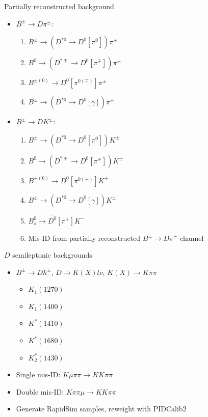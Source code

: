 \documentclass{beamer}
\begin{document}
\begin{frame}{Partially reconstructed background}
  \begin{itemize}
    \setlength\itemsep{1.3em}
    \item{$B^\pm\to D\pi^\pm$:}
    \begin{enumerate}
    \setlength\itemsep{0.4em}
      \item{$B^\pm\to (D^{*0}\to D^0[\pi^0])\pi^\pm$}
      \item{$B^0\to (D^{*\mp}\to D^0[\pi^\mp])\pi^\pm$}
      \item{$B^{\pm(0)}\to D^0[\pi^{0(\mp)}]\pi^\pm$}
      \item{$B^\pm\to(D^{*0}\to D^0[\gamma])\pi^\pm$}
    \end{enumerate}
    \item{$B^\pm\to DK^\pm$:}
    \begin{enumerate}
      \setlength\itemsep{0.4em}
      \item{$B^\pm\to (D^{*0}\to D^0[\pi^0])K^\pm$}
      \item{$B^0\to (D^{*\mp}\to D^0[\pi^\mp])K^\pm$}
      \item{$B^{\pm(0)}\to D^0[\pi^{0(\mp)}]K^\pm$}
      \item{$B^\pm\to(D^{*0}\to D^0[\gamma])K^\pm$}
      \item{$B_s^0\to\bar{D^0}[\pi^+]K^-$}
      \item{Mis-ID from partially reconstructed $B^\pm\to D\pi^\pm$ channel}
    \end{enumerate}
  \end{itemize}
\end{frame}

\begin{frame}{$D$ semileptonic backgrounds}
  \begin{itemize}
    \setlength\itemsep{1em}
    \item{$B^\pm\to Dh^\pm$, $D\to K(X)l\nu$, $K(X)\to K\pi\pi$}
    \begin{itemize}
      \item{$K_1(1270)$}
      \item{$K_1(1400)$}
      \item{$K^*(1410)$}
      \item{$K^*(1680)$}
      \item{$K_2^*(1430)$}
    \end{itemize}
    \item{Single mis-ID: $K\mu\pi\pi\to KK\pi\pi$}
    \item{Double mis-ID: $K\pi\pi\mu\to KK\pi\pi$}
    \item{Generate RapidSim samples, reweight with PIDCalib2}
  \end{itemize}
\end{frame}
\end{document}
